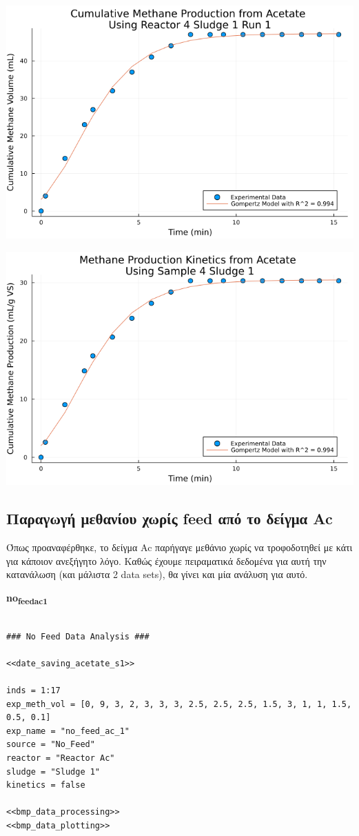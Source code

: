 \documentclass[11pt]{article}
\begin{document}
\begin{center}
\includegraphics[width=.9\linewidth]{../plots/BMPs/Acetate/methane_kinetics_acet_test_4_s1_min.png}
\end{center}

\begin{center}
\includegraphics[width=.9\linewidth]{../plots/BMPs/Acetate/specific_methane_kinetics_acet_test_4_s1.png}
\end{center}

\subsection{Παραγωγή μεθανίου χωρίς feed από το δείγμα Ac}
\label{sec:org49a0c77}
Όπως προαναφέρθηκε, το δείγμα Ac παρήγαγε μεθάνιο χωρίς να τροφοδοτηθεί με κάτι για κάποιον ανεξήγητο λόγο. Καθώς έχουμε πειραματικά δεδομένα για αυτή την κατανάλωση (και μάλιστα 2 data sets), θα γίνει και μία ανάλυση για αυτό.

\textbf{no\textsubscript{feed}\textsubscript{ac}\textsubscript{1}}
\begin{verbatim}

### No Feed Data Analysis ###

<<date_saving_acetate_s1>>

inds = 1:17
exp_meth_vol = [0, 9, 3, 2, 3, 3, 3, 2.5, 2.5, 2.5, 1.5, 3, 1, 1, 1.5, 0.5, 0.1]
exp_name = "no_feed_ac_1"
source = "No_Feed"
reactor = "Reactor Ac"
sludge = "Sludge 1"
kinetics = false

<<bmp_data_processing>>
<<bmp_data_plotting>>
\end{verbatim}
\end{document}
